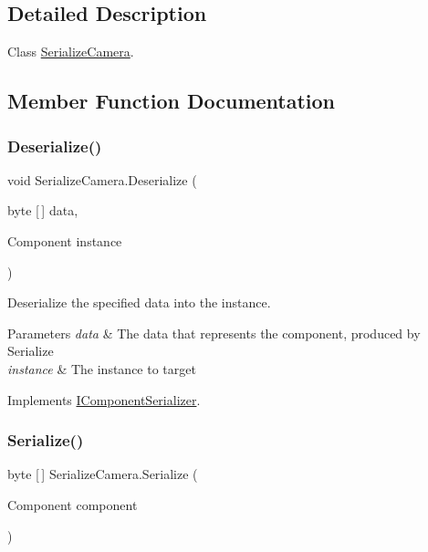 \subsection{Detailed Description}
Class \hyperlink{class_serialize_camera}{Serialize\+Camera}. 



\subsection{Member Function Documentation}
\mbox{\label{class_serialize_camera_af71e86c5582df1d9eb1d4e652fe00f83}} 
\subsubsection{\texorpdfstring{Deserialize()}{Deserialize()}}
{\footnotesize\ttfamily void Serialize\+Camera.\+Deserialize (\begin{DoxyParamCaption}\item[{byte \mbox{[}$\,$\mbox{]}}]{data,  }\item[{Component}]{instance }\end{DoxyParamCaption})\hspace{0.3cm}{\ttfamily [inline]}}



Deserialize the specified data into the instance. 


\begin{DoxyParams}{Parameters}
{\em data} & The data that represents the component, produced by Serialize\\
\hline
{\em instance} & The instance to target\\
\hline
\end{DoxyParams}


Implements \hyperlink{interface_i_component_serializer_a4cc366a5c78b33d47a90c209d8fed883}{I\+Component\+Serializer}.

\mbox{\label{class_serialize_camera_a003d716552672a6f3994a768aded2235}} 
\subsubsection{\texorpdfstring{Serialize()}{Serialize()}}
{\footnotesize\ttfamily byte \mbox{[}$\,$\mbox{]} Serialize\+Camera.\+Serialize (\begin{DoxyParamCaption}\item[{Component}]{component }\end{DoxyParamCaption})\hspace{0.3cm}{\ttfamily [inline]}}



